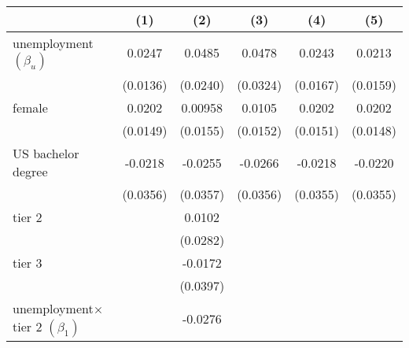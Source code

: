 \begin{table}[htbp]\centering
	\label{tb:table10}
		\begin{adjustbox}{max width=0.59\textwidth}
\begin{tabular}{l*{5}{c}}
\hline\hline
            &\multicolumn{1}{c}{(1)}&\multicolumn{1}{c}{(2)}&\multicolumn{1}{c}{(3)}&\multicolumn{1}{c}{(4)}&\multicolumn{1}{c}{(5)}\\
\hline
unemployment  $\left( \beta_u \right)$    &      0.0247         &      0.0485\sym{*}  &      0.0478         &      0.0243         &      0.0213         \\
            &    (0.0136)         &    (0.0240)         &    (0.0324)         &    (0.0167)         &    (0.0159)         \\
[1em]
female &      0.0202         &     0.00958         &      0.0105         &      0.0202         &      0.0202         \\
            &    (0.0149)         &    (0.0155)         &    (0.0152)         &    (0.0151)         &    (0.0148)         \\
[1em]
US bachelor degree   &     -0.0218         &     -0.0255         &     -0.0266         &     -0.0218         &     -0.0220         \\
            &    (0.0356)         &    (0.0357)         &    (0.0356)         &    (0.0355)         &    (0.0355)         \\
[1em]
tier 2     &                     &      0.0102         &                     &                     &                     \\
            &                     &    (0.0282)         &                     &                     &                     \\
[1em]
tier 3     &                     &     -0.0172         &                     &                     &                     \\
            &                     &    (0.0397)         &                     &                     &                     \\
[1em]
unemployment$\times$ tier 2  $\left( \beta_1 \right)$&                     &     -0.0276         &                     &                     &                     \\

\end{tabular}
\end{adjustbox}
\end{table}
